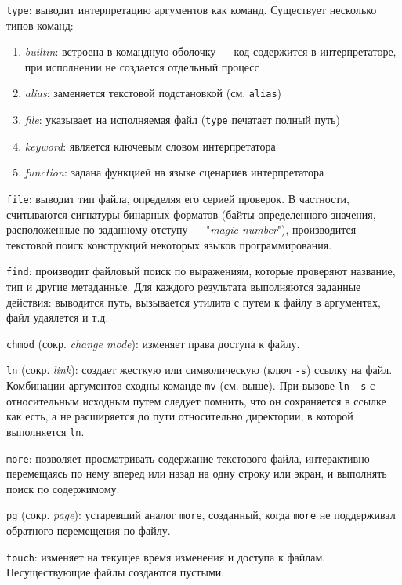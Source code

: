 \documentclass[listings]{labreport}
\begin{document}
\texttt{type}: выводит интерпретацию аргументов как команд. Существует несколько типов команд:

\begin{enumerate}
\item \textit{builtin}: встроена в командную оболочку — код содержится в интерпретаторе, при исполнении не создается отдельный процесс
\item \textit{alias}: заменяется текстовой подстановкой (см. \texttt{alias})
\item \textit{file}: указывает на исполняемая файл (\texttt{type} печатает полный путь)
\item \textit{keyword}: является ключевым словом интерпретатора
\item \textit{function}: задана функцией на языке сценариев интерпретатора
\end{enumerate}

\texttt{file}: выводит тип файла, определяя его серией проверок. В частности, считываются сигнатуры бинарных форматов
(байты определенного значения, расположенные по заданному отступу — "\textit{magic number}"),
производится текстовой поиск конструкций некоторых языков программирования.

\texttt{find}: производит файловый поиск по выражениям, которые проверяют название, тип и другие метаданные.
Для каждого результата выполняются заданные действия: выводится путь, вызывается утилита с путем к файлу в аргументах, файл удаялется и т.д.

\texttt{chmod} (сокр. \textit{change mode}): изменяет права доступа к файлу.

\texttt{ln} (сокр. \textit{link}): создает жесткую или символическую (ключ \texttt{-s}) ссылку на файл.
Комбинации аргументов сходны команде \texttt{mv} (см. выше). При вызове \texttt{ln -s} с относительным исходным
путем следует помнить, что он сохраняется в ссылке как есть, а не расширяется до пути относительно директории,
в которой выполняется \texttt{ln}.

\texttt{more}: позволяет просматривать содержание текстового файла, интерактивно перемещаясь по нему вперед
или назад на одну строку или экран, и выполнять поиск по содержимому.

\texttt{pg} (сокр. \textit{page}): устаревший аналог \texttt{more}, созданный, когда \texttt{more} не поддерживал
обратного перемещения по файлу.

\texttt{touch}: изменяет на текущее время изменения и доступа к файлам. Несуществующие файлы создаются пустыми.
\end{document}

